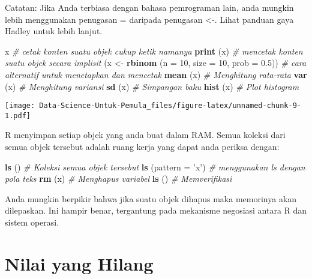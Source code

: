 \documentclass[
]{book}
\newenvironment{Shaded}{\begin{snugshade}}{\end{snugshade}}
\newcommand{\CommentTok}[1]{\textcolor[rgb]{0.56,0.35,0.01}{\textit{#1}}}
\newcommand{\DataTypeTok}[1]{\textcolor[rgb]{0.13,0.29,0.53}{#1}}
\newcommand{\DecValTok}[1]{\textcolor[rgb]{0.00,0.00,0.81}{#1}}
\newcommand{\FloatTok}[1]{\textcolor[rgb]{0.00,0.00,0.81}{#1}}
\newcommand{\KeywordTok}[1]{\textcolor[rgb]{0.13,0.29,0.53}{\textbf{#1}}}
\newcommand{\NormalTok}[1]{#1}
\newcommand{\StringTok}[1]{\textcolor[rgb]{0.31,0.60,0.02}{#1}}
\begin{document}
Catatan: Jika Anda terbiasa dengan bahasa pemrograman lain, anda mungkin lebih menggunakan penugasan = daripada penugasan \textless-. Lihat panduan gaya Hadley untuk lebih lanjut.

\begin{Shaded}
\begin{Highlighting}[]
\NormalTok{x 		                                          }\CommentTok{# cetak konten suatu objek cukup ketik namanya}
\KeywordTok{print}\NormalTok{ (x)                                       }\CommentTok{# mencetak konten suatu objek secara implisit}
\NormalTok{(x <-}\StringTok{ }\KeywordTok{rbinom}\NormalTok{ (}\DataTypeTok{n =} \DecValTok{10}\NormalTok{, }\DataTypeTok{size =} \DecValTok{10}\NormalTok{, }\DataTypeTok{prob =} \FloatTok{0.5}\NormalTok{))   }\CommentTok{# cara alternatif untuk menetapkan dan mencetak}
\KeywordTok{mean}\NormalTok{ (x) 	                                      }\CommentTok{# Menghitung rata-rata}
\KeywordTok{var}\NormalTok{ (x) 		}\CommentTok{# Menghitung variansi}
\KeywordTok{sd}\NormalTok{ (x) 		}\CommentTok{# Simpangan baku}
\KeywordTok{hist}\NormalTok{ (x) 		}\CommentTok{# Plot histogram}
\end{Highlighting}
\end{Shaded}

\texttt{[image: Data-Science-Untuk-Pemula\_files/figure-latex/unnamed-chunk-9-1.pdf]}

R menyimpan setiap objek yang anda buat dalam RAM. Semua koleksi dari semua objek tersebut adalah ruang kerja yang dapat anda periksa dengan:

\begin{Shaded}
\begin{Highlighting}[]
\KeywordTok{ls}\NormalTok{ () 			                                    }\CommentTok{# Koleksi semua objek tersebut}
\KeywordTok{ls}\NormalTok{ (}\DataTypeTok{pattern =} \StringTok{'x'}\NormalTok{) 	                            }\CommentTok{# menggunakan ls dengan pola teks}
\KeywordTok{rm}\NormalTok{ (x) 			                                    }\CommentTok{# Menghapus variabel}
\KeywordTok{ls}\NormalTok{ () 		                                  	  }\CommentTok{# Memverifikasi}
\end{Highlighting}
\end{Shaded}

Anda mungkin berpikir bahwa jika suatu objek dihapus maka memorinya akan dilepaskan. Ini hampir benar, tergantung pada mekanisme negosiasi antara R dan sistem operasi.

\hypertarget{nilai-yang-hilang}{%
\section{Nilai yang Hilang}\label{nilai-yang-hilang}}
\end{document}
